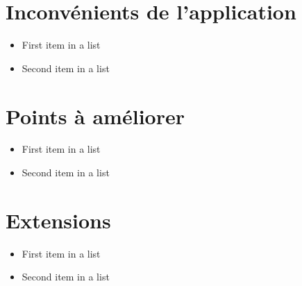 \documentclass[11pt,a4paper,sans]{report}
\begin{document}
\section{Inconvénients de l'application}
\begin{itemize}
    \item First item in a list
    \item Second item in a list
\end{itemize}

\section{Points à améliorer}
\begin{itemize}
    \item First item in a list
    \item Second item in a list
\end{itemize}

\section{Extensions}
\begin{itemize}
    \item First item in a list
    \item Second item in a list
\end{itemize}
\end{document}
